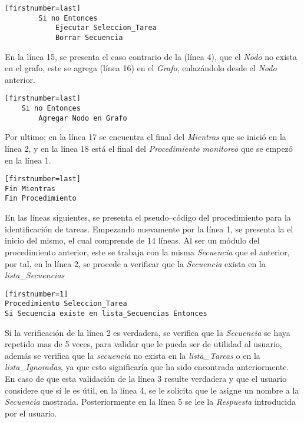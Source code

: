 \begin{tiny}
\begin{lstlisting}[name=EXmonitor][firstnumber=last]
        Si no Entonces
            Ejecutar Seleccion_Tarea
            Borrar Secuencia
\end{lstlisting}
\end{tiny}


En la l\'inea 15, se presenta el caso contrario de la (l\'inea 4), que el 
 \emph{Nodo} no exista en el grafo, este se agrega (l\'inea 16) en el 
 \emph{Grafo}, enlaz\'andolo desde el \emph{Nodo} anterior. 


\begin{tiny}
\begin{lstlisting}[name=EXmonitor][firstnumber=last]
    Si no Entonces
        Agregar Nodo en Grafo
\end{lstlisting}
\end{tiny}

\newpage
Por ultimo; en la l\'inea 17 se encuentra el final del \emph{Mientras} que se 
 inici\'o en la l\'inea 2, y en la l\'inea 18 est\'a el final del 
 \emph{Procedimiento monitoreo} que se empez\'o en la l\'inea 1.

\begin{tiny}
\begin{lstlisting}[name=EXmonitor][firstnumber=last]
Fin Mientras
Fin Procedimiento 
\end{lstlisting}
\end{tiny}




En las l\'ineas siguientes, se presenta el pseudo--c\'odigo del procedimiento
 para la identificaci\'on de tareas. Empezando nuevamente por la l\'inea 1, se 
 presenta la el inicio del mismo, el cual comprende de 14 l\'ineas. Al ser un 
 m\'odulo del procedimiento anterior, este se trabaja con la misma 
 \emph{Secuencia} que el anterior, por tal, en la l\'inea 2, se procede a 
 verificar que la \emph{Secuencia} exista en la \emph{lista\_Secuencias} 

\begin{tiny}
\begin{lstlisting}[name=EXseleccion][firstnumber=1]
Procedimiento Seleccion_Tarea
Si Secuencia existe en lista_Secuencias Entonces
\end{lstlisting}
\end{tiny}

Si la verificaci\'on de la l\'inea 2 es verdadera, se verifica que la 
 \emph{Secuencia} se haya repetido mas de 5 veces, para validar que le pueda 
 ser de utilidad al usuario, adem\'as se verifica que la \emph{secuencia} no 
 exista en la \emph{lista\_Tareas} o en la \emph{lista\_Ignoradas}, ya que 
 esto significar\'ia que ha sido encontrada anteriormente. 
 En caso de que esta validaci\'on de la l\'inea 3 resulte verdadera
 y que el usuario considere que s\'i le es \'util, en la l\'inea 4, se le
 solicita que le asigne un nombre a la \emph{Secuencia} mostrada. 
 Posteriormente en la l\'inea 5 se lee la \emph{Respuesta} introducida por el 
 usuario.

